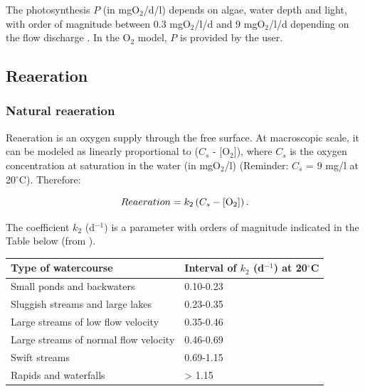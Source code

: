 The photosynthesis $P$ (in mgO$_2$/d/l) depends on algae, water depth and light,
with order of magnitude between 0.3 mgO$_2$/l/d and 9 mgO$_2$/l/d
depending on the flow discharge \cite{streeter_ohio_1925}.
In the O$_2$ model, $P$ is provided by the user.

\subsection{Reaeration}

\subsubsection{Natural reaeration}

Reaeration is an oxygen supply through the free surface.
At macroscopic scale, it can be modeled as linearly proportional to ($C_s$ - [O$_2$]),
where $C_s$ is the oxygen concentration at saturation in the water (in mgO$_2$/l)
(Reminder: $C_s$ = 9 mg/l at 20$^{\circ}$C). Therefore:

\begin{equation}
  Reaeration = k_2 \left( C_s - [\rm{O}_2] \right).
\end{equation}

The coefficient $k_2$ (d$^{-1}$) is a parameter with
orders of magnitude indicated in the Table below
(from \cite{tchobanoglous_wq_1985}).\\

\begin{table}[H]
 			\centering
\begin{tabular}{p{3.0in}p{3.0in}}
\hline
\multicolumn{1}{|p{3.0in}}{Type of watercourse} & 
\multicolumn{1}{|p{3.0in}|}{Interval of $k_2$ (d$^{-1}$) at 20$^{\circ}$C} \\
\hline
\multicolumn{1}{|p{3.0in}}{Small ponds and backwaters} & 
\multicolumn{1}{|p{3.0in}|}{0.10-0.23} \\
\hline
\multicolumn{1}{|p{3.0in}}{Sluggish streams and large lakes} & 
\multicolumn{1}{|p{3.0in}|}{0.23-0.35} \\
\hline
\multicolumn{1}{|p{3.0in}}{Large streams of low flow velocity} & 
\multicolumn{1}{|p{3.0in}|}{0.35-0.46} \\
\hline
\multicolumn{1}{|p{3.0in}}{Large streams of normal flow velocity} & 
\multicolumn{1}{|p{3.0in}|}{0.46-0.69} \\
\hline
\multicolumn{1}{|p{3.0in}}{Swift streams} & 
\multicolumn{1}{|p{3.0in}|}{0.69-1.15} \\
\hline
\multicolumn{1}{|p{3.0in}}{Rapids and waterfalls} & 
\multicolumn{1}{|p{3.0in}|}{> 1.15} \\
\hline

\end{tabular}
\end{table}

